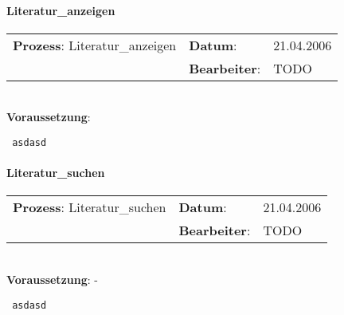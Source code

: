 \paragraph{Literatur\_anzeigen}
\begin{tabular}[t]{p{9.5cm}ll}
\textbf{Prozess}: Literatur\_anzeigen  	&\textbf{Datum}:      &21.04.2006\\
					&\textbf{Bearbeiter}: &TODO\\
\end{tabular}

\hrulefill\\
\textbf{Voraussetzung}:
\begin{verbatim}
 asdasd
\end{verbatim}
\hrulefill


\paragraph{Literatur\_suchen}
\begin{tabular}[t]{p{9.5cm}ll}
\textbf{Prozess}: Literatur\_suchen  	&\textbf{Datum}:      &21.04.2006\\
					&\textbf{Bearbeiter}: &TODO\\
\end{tabular}

\hrulefill\\
\textbf{Voraussetzung}: -
\begin{verbatim}
 asdasd
\end{verbatim}
\hrulefill